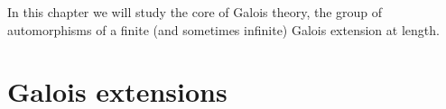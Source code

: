 


In this chapter we will study the core of Galois theory, the group of automorphisms of a finite (and sometimes infinite) Galois extension at length.
    \section{Galois extensions}
